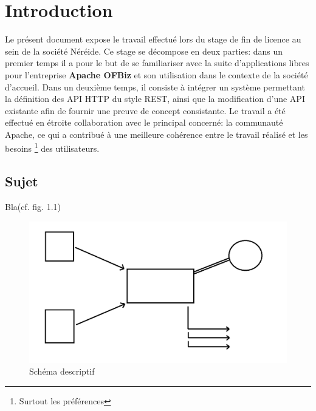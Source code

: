 \chapter{Introduction}

Le présent document expose le travail effectué lors du stage de fin de licence au sein de la société Néréide. Ce stage se décompose en deux parties: dans un premier temps il a pour le but de se familiariser avec la suite d'applications libres pour l'entreprise  \textbf{Apache OFBiz} et son utilisation dans le contexte de la société d'accueil. Dans un deuxième temps, il consiste à intégrer un système permettant la définition des API HTTP du style REST, ainsi que la modification d'une API existante afin de fournir une preuve de concept consistante. Le travail a été effectué en étroite collaboration avec le principal concerné: la communauté Apache, ce qui a contribué à une meilleure cohérence entre le travail réalisé et les besoins \footnote{Surtout les préférences} des utilisateurs.



























\iffalse
\section{Sujet}

Bla(cf. fig. 1.1)\\

\begin{figure}[!h]
\begin{center}
\includegraphics[width=15cm]{presentation/schema}
\end{center}
\caption{Schéma descriptif}
\end{figure}

